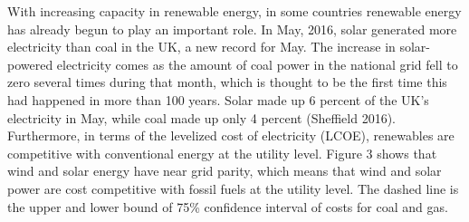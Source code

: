 With increasing capacity in renewable energy, in some countries
renewable energy has already begun to play an important role. In May,
2016, solar generated more electricity than coal in the UK, a new record
for May. The increase in solar-powered electricity comes as the amount
of coal power in the national grid fell to zero several times during
that month, which is thought to be the first time this had happened in
more than 100 years. Solar made up 6 percent of the UK's electricity in
May, while coal made up only 4 percent (Sheffield 2016). Furthermore, in
terms of the levelized cost of electricity (LCOE), renewables are
competitive with conventional energy at the utility level. Figure 3
shows that wind and solar energy have near grid parity, which means that
wind and solar power are cost competitive with fossil fuels at the
utility level. The dashed line is the upper and lower bound of 75\%
confidence interval of costs for coal and gas.